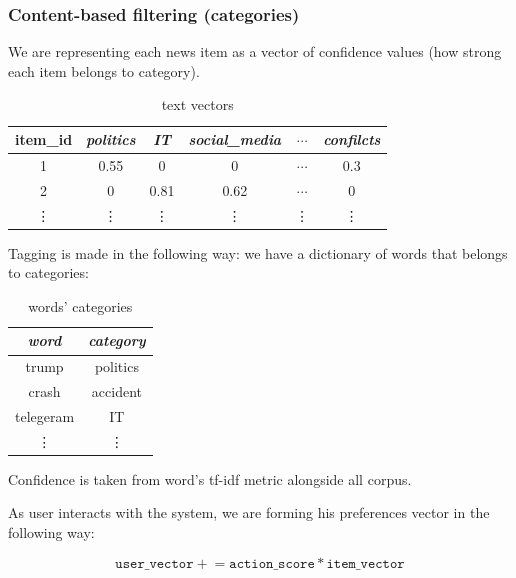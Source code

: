 \documentclass{article}
\begin{document}
\subsubsection{Content-based filtering (categories)}

We are representing each news item as a vector of confidence values (how strong each item belongs to category).

\begin{table}[h]
    \centering
    \begin{tabular}{cccccc}
        \toprule
        item\_id & \textit{politics} & \textit{IT} & \textit{social\_media} & $\cdots$ & \textit{confilcts} \\
        \midrule
        1 & 0.55 & 0 & 0 & $\cdots$ & 0.3 \\
        2 & 0    & 0.81  & 0.62 & $\cdots$ & 0 \\
        \vdots & \vdots & \vdots & \vdots & \vdots & \vdots\\

        \bottomrule
    \end{tabular}%
    \caption{text vectors}
    \label{tab:text_vectors}
\end{table}

Tagging is made in the following way: we have a dictionary of words that belongs to categories:

\begin{table}[h]
    \centering
    \begin{tabular}{cc}
        \toprule
        \textit{word} & \textit{category} \\
        \midrule
        trump & politics \\
        crash & accident \\
        telegeram & IT \\
        \vdots & \vdots \\
        \bottomrule
    \end{tabular}%
    \caption{words' categories}
    \label{tab:words_categories}
\end{table}

Confidence is taken from word's tf-idf metric alongside all corpus.

As user interacts with the system, we are forming his preferences vector in the following way:

\begin{equation}
    \texttt{user\_vector} \mathrel{+}= \texttt{action\_score} * \texttt{item\_vector}
\end{equation}
\end{document}
